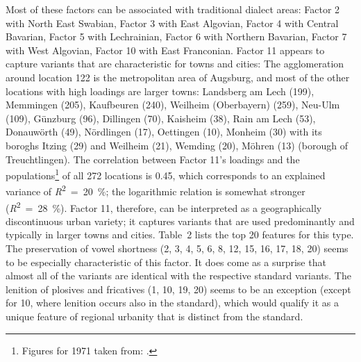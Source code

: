 \documentclass[output=paper]{LSP/langsci}
\begin{document}
Most of these factors can be associated with traditional dialect areas: Factor 2 with North East Swabian, Factor 3 with East Algovian, Factor 4 with Central Bavarian, Factor 5 with Lechrainian, Factor 6 with Northern Bavarian, Factor 7 with West Algovian, Factor 10 with East Franconian. Factor 11 appears to capture variants that are characteristic for towns and cities: The agglomeration around location 122 is the metropolitan area of Augsburg, and most of the other locations with high loadings are larger towns: Landsberg am Lech (199), Memmingen (205), Kaufbeuren (240), Weilheim (Oberbayern) (259), Neu-Ulm (109), Günzburg (96), Dillingen (70), Kaisheim (38), Rain am Lech (53), Donauwörth (49), Nördlingen (17), Oettingen (10), Monheim (30) with its boroghs Itzing (29) and Weilheim (21), Wemding (20), Möhren (13) (borough of Treuchtlingen). The correlation between Factor 11’s loadings and the populations\footnote{Figures for 1971 taken from: \citet{bayerisches_statistisches_landesamt_einwohnerzahlen_1972}.} of all 272 locations is 0.45, which corresponds to an explained variance of \textit{R}\textsuperscript{2}~=~20~\%; the logarithmic relation is somewhat stronger (\textit{R}\textsuperscript{2}~=~28~\%). Factor 11, therefore, can be interpreted as a geographically discontinuous urban variety; it captures variants that are used predominantly and typically in larger towns and cities. Table~2 lists the top 20 features for this type. The preservation of vowel shortness (2, 3, 4, 5, 6, 8, 12, 15, 16, 17, 18, 20) seems to be especially characteristic of this factor. It does come as a surprise that almost all of the variants are identical with the respective standard variants. The lenition of plosives and fricatives (1, 10, 19, 20) seems to be an exception (except for 10, where lenition occurs also in the standard), which would qualify it as a unique feature of regional urbanity that is distinct from the standard.
\end{document}
